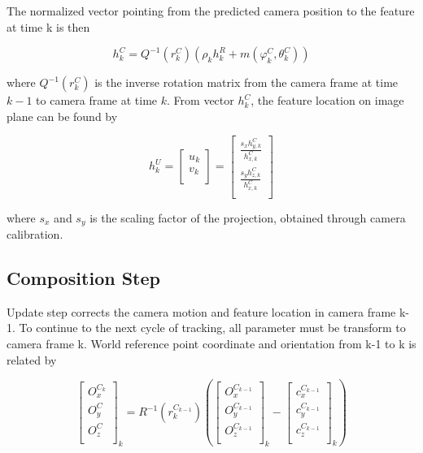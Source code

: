 The normalized vector pointing from the predicted camera position to the 
feature at time k is then 

\begin{equation}
  h_{k}^{C}=Q^{-1}\left(r_{k}^{C}\right)\left(\rho _{k}h_{k}^{R}+m\left(\varphi_{ 
        k}^{C},\theta _{k}^{C}\right)\right)
\end{equation}

\noindent where $Q^{-1}(r_{k}^{C})$ is the inverse rotation matrix from the 
camera frame at time $k-1$ to camera frame at time $k$. From vector 
$h_{k}^{C}$, the feature location on image plane can be found by

\begin{equation}
h_{k}^{U}= \begin{bmatrix}
u_{k} \\
v_{k} \\
\end{bmatrix}=\begin{bmatrix}
\frac{s_{x}h_{y,k}^{C}}{h_{x,k}^{C}} \\
\frac{s_{y}h_{z,k}^{C}}{h_{x,k}^{C}} \\
\end{bmatrix}
\end{equation}

where $s_{x}$ and $s_{y}$ is the scaling factor of the projection, 
obtained through camera calibration.


\subsection{Composition Step}

Update step corrects the camera motion and feature location in camera 
frame k-1. To continue to the next cycle of tracking, all parameter must 
be transform to camera frame k. World reference point coordinate and 
orientation from k-1 to k is related by

\begin{equation}
\begin{bmatrix}
O_{x}^{C_{k}} \\
O_{y}^{C} \\
O_{z}^{C} \\
\end{bmatrix}_{k}=R^{-1}(r_{k}^{C_{k-1}})\left(
\begin{bmatrix}
O_{x}^{C_{k-1}} \\
O_{y}^{C_{k-1}} \\
O_{z}^{C_{k-1}} \\
\end{bmatrix}_{k}- \begin{bmatrix}
c_{x}^{C_{k-1}} \\
c_{y}^{C_{k-1}} \\
c_{z}^{C_{k-1}} \\
\end{bmatrix}_{k}\right)
\end{equation}

